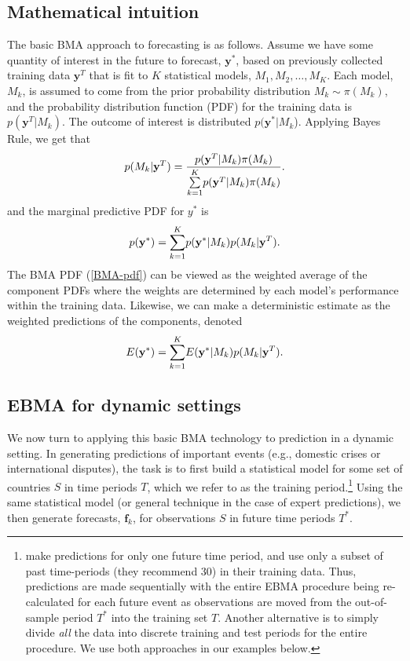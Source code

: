 \documentclass[pdftex,12pt,fullpage,oneside]{amsart}
\begin{document}
\subsection{Mathematical intuition}
The basic BMA approach to forecasting is as follows. Assume we have
some quantity of interest in the future to forecast, $\mathbf{y}^*$, based on
previously collected training data $\mathbf{y}^T$ that is fit to $K$
statistical models, $M_1, M_2, \ldots, M_K$. Each model, $M_k$, is
assumed to come from the prior probability distribution $M_k\sim
\pi(M_k)$, and the probability distribution function (PDF) for the
training data is $p(\mathbf{y}^T|M_k)$. The outcome of interest is distributed
$p(\mathbf{y}^*|M_k$).  Applying Bayes Rule, we get that
\begin{equation} \small
p(M_k|\mathbf{y}^T) = \frac{p(\mathbf{y}^T|M_k)\pi(M_k)}{\underset{k=1}{\overset{K}{\sum}}p(\mathbf{y}^T|M_k)\pi(M_k)}.
\end{equation}
\noindent and the marginal predictive PDF for $y^*$ is
\begin{equation}
\label{BMA-pdf}
\small
p(\mathbf{y}^*) = \underset{k=1}{\overset{K}{\sum}} p(\mathbf{y}^*|M_k)p(M_k|\mathbf{y}^T).
\end{equation}
The BMA PDF (\ref{BMA-pdf}) can be viewed as the weighted average of
the component PDFs where the weights are determined by each model's
performance within the training data.  Likewise, we can make a
deterministic estimate as the weighted predictions of the components,
denoted
\begin{equation} \small
E(\mathbf{y}^*) = \underset{k=1}{\overset{K}{\sum}} E(\mathbf{y}^*|M_k)p(M_k|\mathbf{y}^T).
\end{equation}

\subsection{EBMA for dynamic settings}

We now turn to applying this basic BMA technology to prediction in a
dynamic setting.  In generating predictions of important events (e.g.,
domestic crises or international disputes), the task is to first build
a statistical model for some set of countries $S$ in time periods $T$,
which we refer to as the training
period.\footnote{\citet{Sloughter:2007} make predictions for only one
  future time period, and use only a subset of past time-periods (they
  recommend 30) in their training data. Thus, predictions are made
  sequentially with the entire EBMA procedure being re-calculated for
  each future event as observations are moved from the out-of-sample
  period $T^*$ into the training set $T$. Another alternative is to
  simply divide \textit{all} the data into discrete training and test
  periods for the entire procedure.  We use both approaches in our
  examples below.}  Using the same statistical model (or general
technique in the case of expert predictions), we then generate
forecasts, $\mathbf{f}_k$, for observations $S$ in future time periods
$T^*$.
\end{document}
